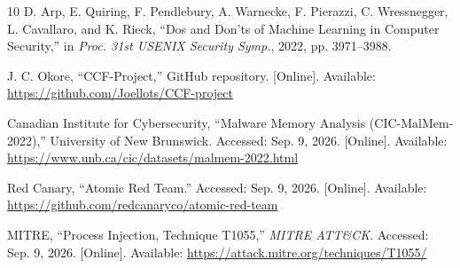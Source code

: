 \documentclass[conference]{IEEEtran}
\begin{document}
\begin{thebibliography}{10}
 D. Arp, E. Quiring, F. Pendlebury, A. Warnecke,
F. Pierazzi, C. Wressnegger, L. Cavallaro, and K. Rieck,
``Dos and Don'ts of Machine Learning in Computer Security,'' in
\textit{Proc. 31st USENIX Security Symp.}, 2022, pp. 3971--3988.

 J. C. Okore, ``CCF-Project,'' GitHub repository.
[Online]. Available:
\url{https://github.com/Joellots/CCF-project}

 Canadian Institute for Cybersecurity,
``Malware Memory Analysis (CIC-MalMem-2022),'' University of New Brunswick.
Accessed: Sep. 9, 2026. [Online]. Available:
\url{https://www.unb.ca/cic/datasets/malmem-2022.html}

 Red Canary, ``Atomic Red Team.''
Accessed: Sep. 9, 2026. [Online]. Available:
\url{https://github.com/redcanaryco/atomic-red-team}

 MITRE, ``Process Injection, Technique T1055,''
\textit{MITRE ATT\&CK}.
Accessed: Sep. 9, 2026. [Online]. Available:
\url{https://attack.mitre.org/techniques/T1055/}

\end{thebibliography}
\end{document}
